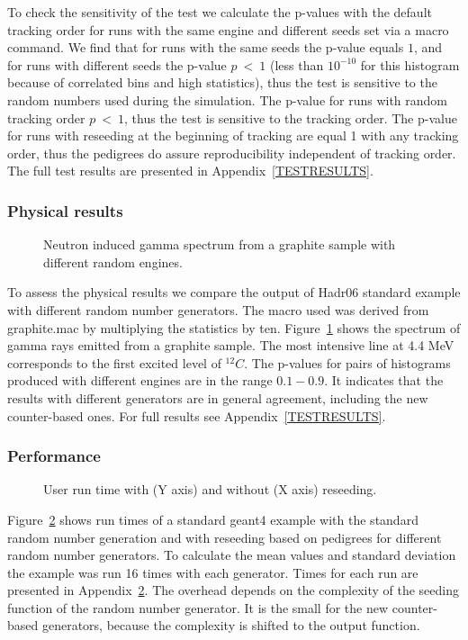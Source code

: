 \documentclass[a4paper, 12pt]{article} %
\begin{document}
   To check the sensitivity of the test we calculate the p-values with the default tracking order for runs with the same engine and different seeds set via a macro command.
   We find that for runs with the same seeds the p-value equals $1$, and for runs with different seeds the p-value $p\ <\ 1$ (less than $10^{-10}$ for this histogram because of correlated bins and high statistics), thus the test is sensitive to the random numbers used during the simulation.
   The p-value for runs with random tracking order $p\ <\ 1$, thus the test is sensitive to the tracking order.
   The p-value for runs with reseeding at the beginning of tracking are equal 1 with any tracking order, thus the pedigrees do assure reproducibility independent of tracking order.
   The full test results are presented in Appendix~\ref{TESTRESULTS}.
  \subsubsection{Physical results}
   \begin{figure}
    \label{GAMMASPECTRUM}
    \scalebox{.8}{}
    \caption{Neutron induced gamma spectrum from a graphite sample with different random engines.}
   \end{figure}
   To assess the physical results we compare the output of Hadr06 standard example with different random number generators.
   The macro used was derived from graphite.mac by multiplying the statistics by ten.
   Figure~\ref{GAMMASPECTRUM} shows the spectrum of gamma rays emitted from a graphite sample.
   The most intensive line at 4.4 MeV corresponds to the first excited level of $^{12}C$.
   The p-values for pairs of histograms produced with different engines are in the range $0.1 - 0.9$.
   It indicates that the results with different generators are in general agreement, including the new counter-based ones.
   For full results see Appendix~\ref{TESTRESULTS}.
  
  \subsubsection{Performance}
  
    \begin{figure}
   \scalebox{.8}{}
   \label{USERTIME}
   \caption{User run time with (Y axis) and without (X axis) reseeding.}
  \end{figure}
  
  Figure~\ref{USERTIME} shows run times of a standard geant4 example with the standard random number generation and with reseeding based on pedigrees for different random number generators.
  To calculate the mean values and standard deviation the example was run 16 times with each generator.
  Times for each run are presented in Appendix~\ref{USERTIME}.
  The overhead depends on the complexity of the seeding function of the random number generator.
  It is the small for the new counter-based generators,
  because the complexity is shifted to the output function.
 
\end{document}
